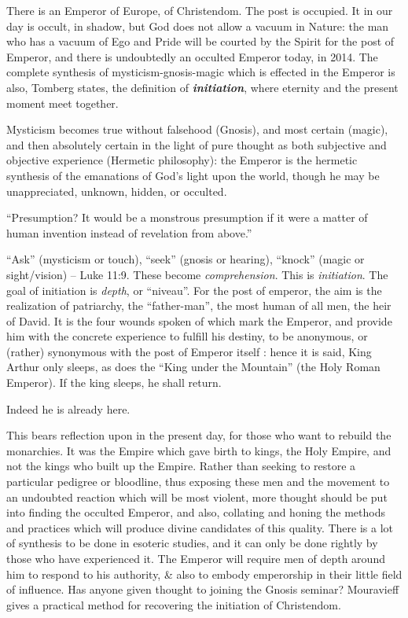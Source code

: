 There is an Emperor of Europe, of Christendom. The post is occupied. It in our day is occult, in shadow, but God does not allow a vacuum in Nature: the man who has a vacuum of Ego and Pride will be courted by the Spirit for the post of Emperor, and there is undoubtedly an occulted Emperor today, in 2014. The complete synthesis of mysticism-gnosis-magic which is effected in the Emperor is also, Tomberg states, the definition of \textbf{\emph{initiation}}, where eternity and the present moment meet together.

Mysticism becomes true without falsehood (Gnosis), and most certain (magic), and then absolutely certain in the light of pure thought as both subjective and objective experience (Hermetic philosophy): the Emperor is the hermetic synthesis of the emanations of God's light upon the world, though he may be unappreciated, unknown, hidden, or occulted.

``Presumption? It would be a monstrous presumption if it were a matter of human invention instead of revelation from above.''

``Ask'' (mysticism or touch), ``seek'' (gnosis or hearing), ``knock'' (magic or sight/vision) -- Luke 11:9. These become \emph{comprehension}. This is \emph{initiation}. The goal of initiation is \emph{depth}, or ``niveau''. For the post of emperor, the aim is the realization of patriarchy, the ``father-man'', the most human of all men, the heir of David. It is the four wounds spoken of which mark the Emperor, and provide him with the concrete experience to fulfill his destiny, to be anonymous, or (rather) synonymous with the post of Emperor itself : hence it is said, King Arthur only sleeps, as does the ``King under the Mountain'' (the Holy Roman Emperor). If the king sleeps, he shall return.

Indeed he is already here.

This bears reflection upon in the present day, for those who want to rebuild the monarchies. It was the Empire which gave birth to kings, the Holy Empire, and not the kings who built up the Empire. Rather than seeking to restore a particular pedigree or bloodline, thus exposing these men and the movement to an undoubted reaction which will be most violent, more thought should be put into finding the occulted Emperor, and also, collating and honing the methods and practices which will produce divine candidates of this quality. There is a lot of synthesis to be done in esoteric studies, and it can only be done rightly by those who have experienced it. The Emperor will require men of depth around him to respond to his authority, \& also to embody emperorship in their little field of influence. Has anyone given thought to joining the Gnosis seminar? Mouravieff gives a practical method for recovering the initiation of Christendom.

